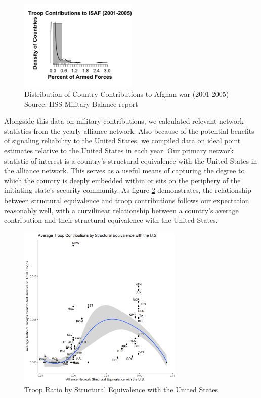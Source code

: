 \documentclass[12pt,letterpaper]{article}
\begin{document}
			\begin{figure}[H]
			\centering
				\includegraphics[width=0.5\textwidth]{troops_hist_largebin.png}
			\caption{Distribution of Country Contributions to Afghan war (2001-2005) Source: IISS Military Balance report}
			\label{fig:troop_hist}
			\end{figure}

		Alongside this data on military contributions, we calculated relevant network statistics from the yearly alliance network. Also because of the potential benefits of signaling reliability to the United States, we compiled data on ideal point estimates relative to the United States in each year. Our primary network statistic of interest is a country's structural equivalence with the United States in the alliance network. This serves as a useful means of capturing the degree to which the country is deeply embedded within or sits on the periphery of the initiating state's security community. As figure \ref{fig:contr_sequiv} demonstrates, the relationship between structural equivalence and troop contributions follows our expectation reasonably well, with a curvilinear relationship between a country's average contribution and their structural equivalence with the United States.

		\begin{figure}[H]
			\centering
				\includegraphics[width=0.7\textwidth]{figures/contributions.png}
			\caption{Troop Ratio by Structural Equivalence with the United States}
			\label{fig:contr_sequiv}
		\end{figure}
\end{document}
